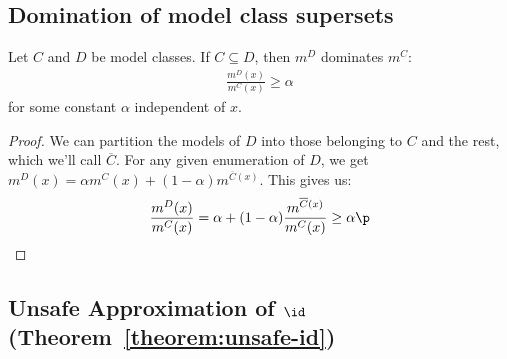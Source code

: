 \subsection{Domination of model class supersets}

\begin{lemma}
Let $C$ and $D$ be model classes. If $C \subseteq D$, then $m^D$ dominates $m^C$:
\begin{align*}
\frac{m^D(x)}{m^C(x)} \geq \alpha
\end{align*}
for some constant $\alpha$ independent of $x$.
\label{lemma:subset-dominance}
\end{lemma}
\begin{proof}
We can partition the models of $D$ into those belonging to $C$ and the rest, which we'll call $\overline{C}$. For any given enumeration of $D$, we get $m^D(x) = \alpha m^C(x) + (1-\alpha)m^{\overline{C}(x)}$. This gives us:
\begin{align*}
\frac{m^D(x)}{m^C(x)} = \alpha + (1-\alpha)\frac{m^{\overline{C}(x)}}{m^C(x)} \geq \alpha \p
\end{align*}
\end{proof}

\subsection{Unsafe Approximation of $\id$ (Theorem~\ref{theorem:unsafe-id})}

